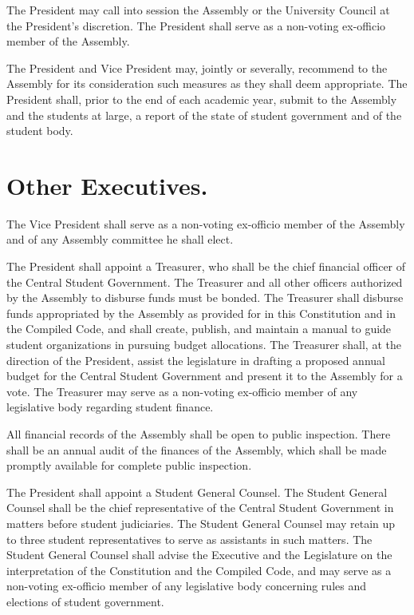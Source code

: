     The President may call into session the Assembly or the University Council at the President's discretion. The President shall serve as a non-voting ex-officio member of the Assembly.

    The President and Vice President may, jointly or severally, recommend to the Assembly for its consideration such measures as they shall deem appropriate. The President shall, prior to the end of each academic year, submit to the Assembly and the students at large, a report of the state of student government and of the student body.

\section{Other Executives.}
    The Vice President shall serve as a non-voting ex-officio member of the Assembly and of any Assembly committee he shall elect.

   The President shall appoint a Treasurer, who shall be the chief financial officer of the Central Student Government. The Treasurer and all other officers authorized by the Assembly to disburse funds must be bonded. The Treasurer shall disburse funds appropriated by the Assembly as provided for in this Constitution and in the Compiled Code, and shall create, publish, and maintain a manual to guide student organizations in pursuing budget allocations. The Treasurer shall, at the direction of the President, assist the legislature in drafting a proposed annual budget for the Central Student Government and present it to the Assembly for a vote. The Treasurer may serve as a non-voting ex-officio member of any legislative body regarding student finance.

    All financial records of the Assembly shall be open to public inspection. There shall be an annual audit of the finances of the Assembly, which shall be made promptly available for complete public inspection.

    The President shall appoint a Student General Counsel. The Student General Counsel shall be the chief representative of the Central Student Government in matters before student judiciaries. The Student General Counsel may retain up to three student representatives to serve as assistants in such matters. The Student General Counsel shall advise the Executive and the Legislature on the interpretation of the Constitution and the Compiled Code, and may serve as a non-voting ex-officio member of any legislative body concerning rules and elections of student government.
    
